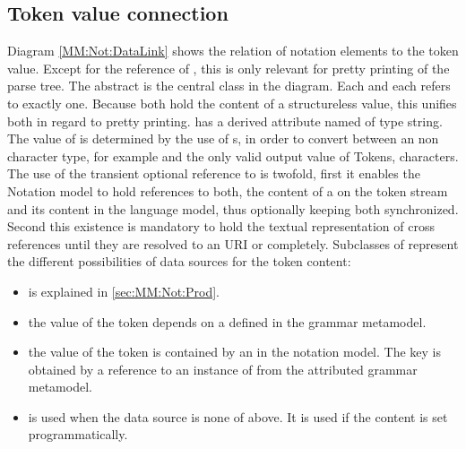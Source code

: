 \subsection{Token value connection}
Diagram \ref{MM:Not:DataLink} shows the relation of notation elements to the token value. Except for the  reference of , this is only relevant for pretty printing of the parse tree. The abstract  is the central class in the diagram. Each  and each  refers to exactly one. Because both hold the content of a structureless value, this unifies both in regard to pretty printing.  has a derived attribute named  of type string. The value of  is determined by the use of s, in order to convert between an non character type, for example  and the only valid output value of Tokens, characters. The use of the transient optional reference to  is twofold, first it enables the Notation model to hold references to both, the content of a  on the token stream and its content in the language model, thus optionally keeping both synchronized. Second this existence is mandatory to hold the textual representation of cross references until they are resolved to an URI or completely. Subclasses of  represent the different possibilities of data sources for the token content:
\begin{itemize}
	\item {} is explained in \ref{sec:MM:Not:Prod}.
	\item {} the value of the token depends on a   defined in the grammar metamodel.
	\item {} the value of the token is contained by an  in the notation model. The key is obtained by a reference to an instance of  from the  attributed grammar metamodel.
	\item {} is used when the data source is none of above. It is used if the content is set programmatically.
\end{itemize}


